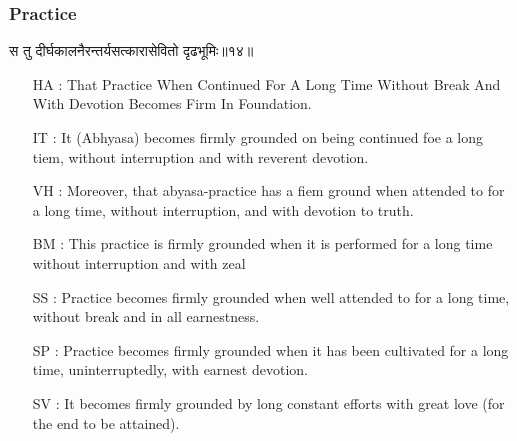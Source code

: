 \begin{frame}[fragile]\frametitle{Practice}
\begin{sanskrit}
स तु दीर्घकालनैरन्तर्यसत्कारासेवितो दृढभूमिः॥१४॥
\end{sanskrit}

	\begin{itemize}
	\item [HA]: That Practice When Continued For A Long Time Without Break And With Devotion Becomes Firm In Foundation.
	\item [IT]: It (Abhyasa) becomes firmly grounded on being continued foe a long tiem, without interruption and with reverent devotion.
	\item [VH]: Moreover, that abyasa-practice has a fiem ground when attended to for a long time, without interruption, and with devotion to truth.
	\item [BM]: This practice is firmly grounded when it is performed for a long time without interruption and with zeal
	\item [SS]: Practice becomes firmly grounded when well attended to for a long time, without break and in all earnestness.
	\item [SP]: Practice becomes firmly grounded when it has been cultivated for a long time, uninterruptedly, with earnest devotion.
	\item [SV]: It becomes firmly grounded by long constant efforts with great love (for the end to be attained). 
	\end{itemize}
\end{frame}

